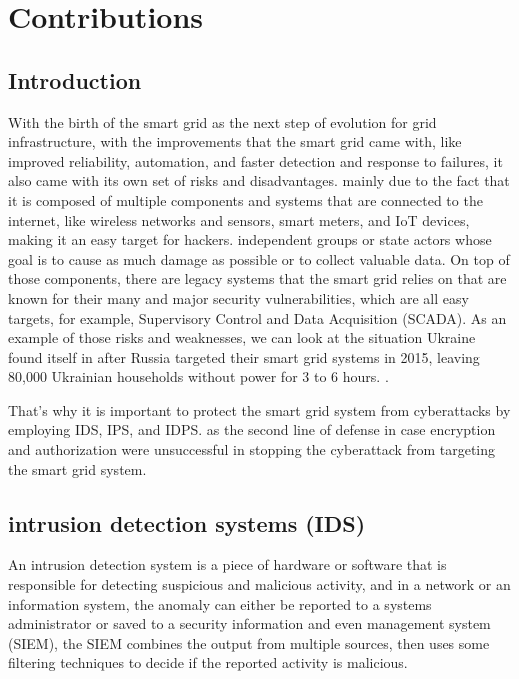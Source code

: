 \chapter{Contributions} \label{chap:Contributions}


\section*{Introduction}
With the birth of the smart grid as the next step of evolution for grid infrastructure, with the improvements that the smart grid came with, like improved reliability, automation, and faster detection and response to failures, it also came with its own set of risks and disadvantages. mainly due to the fact that it is composed of multiple components and systems that are connected to the internet, like wireless networks and sensors, smart meters, and IoT devices, making it an easy target for hackers. independent groups or state actors whose goal is to cause as much damage as possible or to collect valuable data. On top of those components, there are legacy systems that the smart grid relies on that are known for their many and major security vulnerabilities, which are all easy targets, for example, Supervisory Control and Data Acquisition (SCADA). As an example of those risks and weaknesses, we can look at the situation Ukraine found itself in after Russia targeted their smart grid systems in 2015, leaving 80,000 Ukrainian households without power for 3 to 6 hours. \cite{ukrain-sg-attack}.

That's why it is important to protect the smart grid system from cyberattacks by employing IDS, IPS, and IDPS. 
as the second line of defense in case encryption and authorization were unsuccessful in stopping the cyberattack from targeting the smart grid system.

\newpage




\section{intrusion detection systems (IDS)}
An intrusion detection system is a piece of hardware or software that is responsible for detecting suspicious and malicious activity, and in a network or an information system, the anomaly can either be reported to a systems administrator or saved to a security information and even management system (SIEM), the SIEM combines the output from multiple sources, then uses some filtering techniques to decide if the reported activity is malicious. \cite{1}






